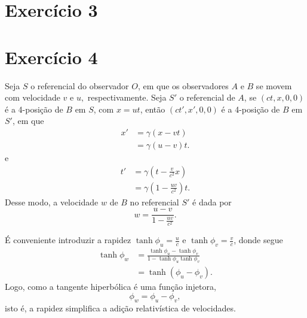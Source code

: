 \documentclass[12pt,a4paper]{article}
\numberwithin{equation}{section}
\begin{document}
\section*{Exercício 3}
\section*{Exercício 4}
Seja \(S\) o referencial do observador \(O\), em que os observadores \(A\) e \(B\) se movem com velocidade \(v\) e \(u,\) respectivamente. Seja \(S'\) o referencial de \(A\), se \((ct, x, 0, 0)\) é a 4-posição de \(B\) em \(S\), com \(x = ut\), então \((ct', x', 0, 0)\) é a 4-posição de \(B\) em \(S'\), em que
\begin{align*}
    x' &= \gamma \left(x - vt\right)\\
       &= \gamma (u - v)t.
\end{align*}
e
\begin{align*}
    t' &= \gamma \left(t - \frac{v}{c^2}x\right)\\
       &= \gamma \left(1 - \frac{uv}{c^2}\right)t.
\end{align*}
Desse modo, a velocidade \(w\) de \(B\) no referencial \(S'\) é dada por
\begin{equation*}
    w = \frac{u - v}{1 - \frac{uv}{c^2}}.
\end{equation*}

É conveniente introduzir a rapidez \(\tanh \phi_u = \frac{u}{c}\) e \(\tanh \phi_v = \frac{v}{c}\), donde segue
\begin{align*}
    \tanh \phi_w &= \frac{\tanh \phi_u - \tanh \phi_v}{1 - \tanh \phi_u \tanh \phi_v}\\
                 &= \tanh\left(\phi_u - \phi_v\right).
\end{align*}
Logo, como a tangente hiperbólica é uma função injetora,
\begin{equation*}
    \phi_w = \phi_u - \phi_v,
\end{equation*}
isto é, a rapidez simplifica a adição relativística de velocidades.
\end{document}
